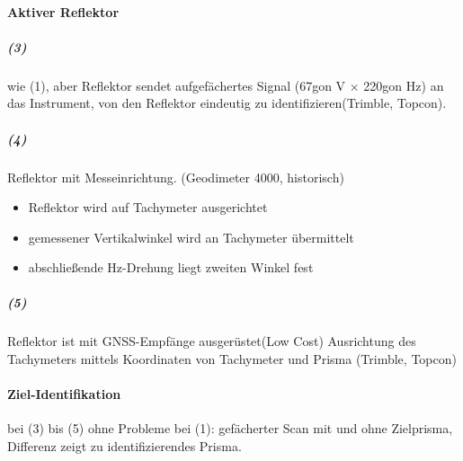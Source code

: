 \documentclass[12pt]{article}
\begin{document}
\paragraph{Aktiver Reflektor}
\subparagraph{(3)}
wie (1), aber Reflektor sendet aufgefächertes Signal (67gon V $\times$ 220gon Hz) an das Instrument, von den Reflektor eindeutig zu identifizieren(Trimble, Topcon).
\subparagraph{(4)}
Reflektor mit Messeinrichtung. (Geodimeter 4000, historisch)
\begin{itemize}
	\item Reflektor wird auf Tachymeter ausgerichtet
	\item gemessener Vertikalwinkel wird an Tachymeter übermittelt
	\item abschließende Hz-Drehung liegt zweiten Winkel fest 
\end{itemize}
\subparagraph{(5)}
Reflektor ist mit GNSS-Empfänge ausgerüstet(Low Cost) Ausrichtung des Tachymeters mittels Koordinaten von Tachymeter und Prisma (Trimble, Topcon)
\paragraph{Ziel-Identifikation}
bei (3) bis (5) ohne Probleme \newline
bei (1): gefächerter Scan mit und ohne Zielprisma, Differenz zeigt zu identifizierendes Prisma.
\end{document}
